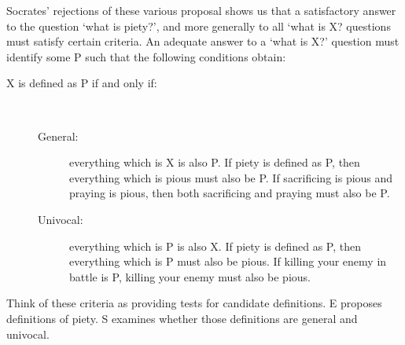 \documentclass[oneside]{article}
\begin{document}
Socrates' rejections of these various proposal shows us that a satisfactory answer to the question `what is piety?', and more generally to all `what is X? questions must satisfy certain criteria. An adequate answer to a `what is X?' question must identify some P such that the following conditions obtain:
\begin{description}
\item[ X is defined as P if and only if:]\
\begin{description}
\item[General:] everything which is X is also P. If piety is defined as P, then everything which is pious must also be P. If sacrificing is pious and praying is pious, then both sacrificing and praying must also be P. 
\item[Univocal:] everything which is P is also X. If piety is defined as P, then everything which is P must also be pious. If killing your enemy in battle is P, killing your enemy must also be pious. 
\end{description}
\end{description}

\noindent Think of these criteria as providing tests for candidate definitions. E proposes definitions of piety. S examines whether those definitions are general and univocal. 








\end{document}
